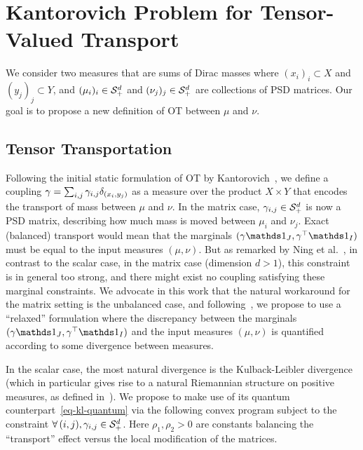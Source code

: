 
\section{Kantorovich Problem for Tensor-Valued Transport}

We consider two measures that are sums of Dirac masses
where $(x_i)_i \subset X$ and $(y_j)_j \subset Y$, and $(\mu_i)_i \in \mathcal{S}_+^d$ and $(\nu_j)_j \in \mathcal{S}_+^d$ are collections of PSD matrices. 
%
Our goal is to propose a new definition of OT between $\mu$ and $\nu$. 


\subsection{Tensor Transportation}
\label{sec-tensor-ot}

Following the initial static formulation of OT by Kantorovich~, we define a coupling $\gamma = \sum_{i,j}\gamma_{i,j} \delta_{(x_i,y_j)}$ as a measure over the product $X \times Y$ that encodes the transport of mass between $\mu$ and $\nu$. In the matrix case, $\gamma_{i,j} \in \mathcal{S}_+^d$ is now a PSD matrix, describing how much mass is moved between $\mu_i$ and $\nu_j$. 
% 
Exact (balanced) transport would mean that the marginals $(\ga \ones_J,\ga^\top \ones_I)$ must be equal to the input measures $(\mu,\nu)$. But as remarked by Ning et al.~, in contrast to the scalar case, in the matrix case (dimension $d>1$), this constraint is in general too strong, and there might exist no coupling satisfying these marginal constraints.
%
We advocate in this work that the natural workaround for the matrix setting is the unbalanced case, and following~\cite{LieroMielkeSavareLong}, we propose to use a ``relaxed'' formulation where the discrepancy between the marginals $(\ga \ones_J,\ga^\top \ones_I)$ and the input measures $(\mu,\nu)$ is quantified according to some divergence between measures. 

In the scalar case, the most natural divergence is the Kulback-Leibler divergence (which in particular gives rise to a natural Riemannian structure on positive measures, as defined in~\cite{LieroMielkeSavareCourt,kondratyev2015,2016-chizat-focm}).  We propose to make use of its quantum counterpart~\eqref{eq-kl-quantum} %
%
via
  the following convex program
subject to the constraint $\forall \, (i,j), \gamma_{i,j} \in \mathcal{S}_+^d$.
Here $\rho_1,\rho_2 >0$ are constants balancing the ``transport'' effect versus the local modification of the matrices. 

